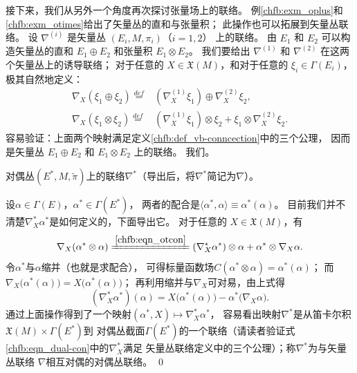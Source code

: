 接下来，我们从另外一个角度再次探讨张量场上的联络。
例\ref{chfb:exm_oplus}和\ref{chfb:exm_otimes}给出了矢量丛的直和与张量积；
此操作也可以拓展到矢量丛联络。
设 $\nabla^{(i)}$ 是矢量丛 $(E_i, M,\pi_i)$（$i=1,2$） 上的联络。 
由 $E_1$ 和 $E_2$ 可以构造矢量丛的直和 $E_1 \oplus E_2$ 和张量积 $E_1 \otimes E_2$。
我们要给出 $\nabla^{(1)}$ 和 $\nabla^{(2)}$ 在这两个矢量丛上的诱导联络；
对于任意的 $X \in \mathfrak{X}(M)$，和对于任意的 $\xi_i \in \Gamma(E_i)$，
极其自然地定义：
\begin{align}
    \nabla_X\left(\xi_1 \oplus \xi_2\right)\overset{def}{=}&
    \left(\nabla_X^{(1)} \xi_1\right) \oplus \nabla_X^{(2)} \xi_2, \label{chfb:eqn_opcon} \\
    \nabla_X\left(\xi_1 \otimes \xi_2\right)\overset{def}{=}& \left(\nabla_X^{(1)} \xi_1\right) \otimes 
    \xi_2+\xi_1 \otimes \nabla_X^{(2)} \xi_2 . \label{chfb:eqn_otcon}
\end{align}
容易验证：上面两个映射满足定义\ref{chfb:def_vb-conncection}中的三个公理，
因而是矢量丛 $E_1 \oplus E_2$ 和 $E_1 \otimes E_2$ 上的联络。
我们。


\begin{example}
    对偶丛$(E^*,M,\tilde{\pi})$上的联络$\nabla^*$（导出后，将$\nabla^*$简记为$\nabla$）。
\end{example}
设$\alpha \in \Gamma(E)$，$\alpha^*\in \Gamma(E^*)$，
两者的配合是$\langle \alpha^*, \alpha \rangle \equiv \alpha^*(\alpha)$。
目前我们并不清楚$\nabla_X^* \alpha^*$是如何定义的，下面导出它。
对于任意的 $X \in \mathfrak{X}(M)$，有
\begin{equation*}
    \nabla_X( \alpha^* \otimes \alpha )\xlongequal{\ref{chfb:eqn_otcon}}
    (\nabla_X^* \alpha^*)\otimes \alpha + \alpha^* \otimes \nabla_X \alpha .
\end{equation*}
令$\alpha^*$与$\alpha$缩并（也就是求配合），
可得标量函数场$C(\alpha^* \otimes \alpha)=\alpha^*(\alpha)$；
而$\nabla_X\bigl( \alpha^*(\alpha) \bigr)=X \bigl( \alpha^*(\alpha) \bigr)$；
再利用缩并与$\nabla_X$可对易，由上式得
\begin{equation}\label{chfb:eqn_dual-con}
    (\nabla_X^* \alpha^* )(\alpha)=X\bigl(\alpha^*(\alpha)\bigr)-\alpha^*\bigl(\nabla_X \alpha\bigr).
\end{equation}
通过上面操作得到了一个映射$(\alpha^*, X) \mapsto \nabla_X^* \alpha^*$，
容易看出映射$\nabla^*$是从笛卡尔积$\mathfrak{X}(M)\times \Gamma(E^*)$到
对偶丛截面$\Gamma (E^*)$的一个联络（请读者验证式\eqref{chfb:eqn_dual-con}中的$\nabla_X^*$满足
矢量丛联络定义中的三个公理）；称$\nabla^*$为与矢量丛联络 $\nabla$相互对偶的对偶丛联络。
\qed



